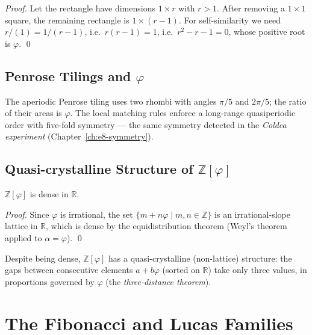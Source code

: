 \begin{proof}
  Let the rectangle have dimensions $1 \times r$ with $r > 1$.
  After removing a $1 \times 1$ square, the remaining rectangle is
  $1 \times (r-1)$.  For self-similarity we need $r/(1) = 1/(r-1)$,
  i.e.\ $r(r-1) = 1$, i.e.\ $r^2 - r - 1 = 0$, whose positive root
  is $\varphi$.  \qed
\end{proof}

\subsection{Penrose Tilings and $\varphi$}

The aperiodic Penrose tiling \cite{penrose1974} uses two rhombi with
angles $\pi/5$ and $2\pi/5$; the ratio of their areas is $\varphi$.
The local matching rules enforce a long-range quasiperiodic order
with five-fold symmetry — the same symmetry detected in the
\emph{Coldea experiment} (Chapter~\ref{ch:e8-symmetry}).

\subsection{Quasi-crystalline Structure of $\mathbb{Z}[\varphi]$}

\begin{proposition}\label{prop:density}
  $\mathbb{Z}[\varphi]$ is dense in $\mathbb{R}$.
\end{proposition}

\begin{proof}
  Since $\varphi$ is irrational, the set $\{m + n\varphi \mid m, n \in \mathbb{Z}\}$
  is an irrational-slope lattice in $\mathbb{R}$, which is dense by the
  equidistribution theorem (Weyl's theorem applied to $\alpha = \varphi$).
  \qed
\end{proof}

Despite being dense, $\mathbb{Z}[\varphi]$ has a quasi-crystalline
(non-lattice) structure: the gaps between consecutive elements
$a + b\varphi$ (sorted on $\mathbb{R}$) take only three values,
in proportions governed by $\varphi$ (the \emph{three-distance theorem}).


\section{The Fibonacci and Lucas Families}
\label{sec:monad-fib-lucas}

